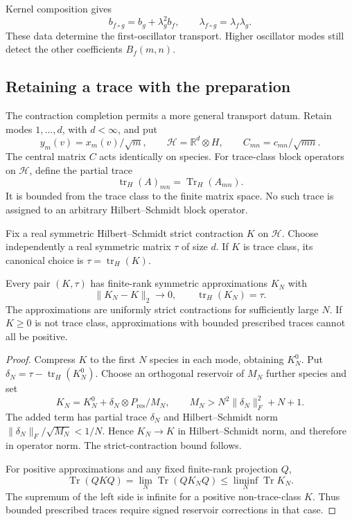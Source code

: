 Kernel composition gives
\[
 b_{f\circ g}=b_g+\lambda_g^2b_f,\qquad
 \lambda_{f\circ g}=\lambda_f\lambda_g.
\]
These data determine the first-oscillator
transport. Higher oscillator modes still
detect the other coefficients \(B_f(m,n)\).

\subsection{Retaining a trace with the preparation}

The contraction completion permits a more
general transport datum. Retain modes
\(1,\ldots,d\), with \(d<\infty\), and put
\[
 y_m(v)=x_m(v)/\sqrt m,\qquad
 \mathcal H=\mathbb R^d\otimes H,\qquad
 C_{mn}=c_{mn}/\sqrt{mn}.
\]
The central matrix \(C\) acts identically
on species. For trace-class block operators
on \(\mathcal H\), define the partial trace
\[
                   \operatorname{tr}_H(A)_{mn}
                             =\operatorname{Tr}_H(A_{mn}).
\]
It is bounded from the trace class to
the finite matrix space.
No such trace is assigned to an arbitrary
Hilbert--Schmidt block operator.

Fix a real symmetric Hilbert--Schmidt strict
contraction \(K\) on \(\mathcal H\).
Choose independently a real symmetric matrix
\(\tau\) of size \(d\).
If \(K\) is trace class, its canonical
choice is \(\tau=\operatorname{tr}_H(K)\).

\begin{lemma}\label{v4-lem:singular-trace-approximation}
Every pair \((K,\tau)\) has finite-rank
symmetric approximations \(K_N\) with
\[
          \|K_N-K\|_2\longrightarrow0,\qquad
          \operatorname{tr}_H(K_N)=\tau.
\]
The approximations are uniformly strict
contractions for sufficiently large \(N\).
If \(K\geq0\) is not trace class,
approximations with bounded prescribed
traces cannot all be positive.
\end{lemma}

\begin{proof}
Compress \(K\) to the first \(N\) species
in each mode, obtaining \(K_N^0\).
Put \(\delta_N=\tau-\operatorname{tr}_H(K_N^0)\).
Choose an orthogonal reservoir of \(M_N\)
further species and set
\[
 K_N=K_N^0+\delta_N\otimes P_{\mathrm{res}}/M_N,
 \qquad M_N>N^2\|\delta_N\|_F^2+N+1.
\]
The added term has partial trace \(\delta_N\)
and Hilbert--Schmidt norm
\(\|\delta_N\|_F/\sqrt{M_N}<1/N\).
Hence \(K_N\to K\) in Hilbert--Schmidt norm,
and therefore in operator norm.
The strict-contraction bound follows.

For positive approximations and any fixed
finite-rank projection \(Q\),
\[
 \operatorname{Tr}(QKQ)
    =\lim_N\operatorname{Tr}(QK_NQ)
               \leq\liminf_N\operatorname{Tr}K_N.
\]
The supremum of the left side is infinite
for a positive non-trace-class \(K\).
Thus bounded prescribed traces require
signed reservoir corrections in that case.
\end{proof}


